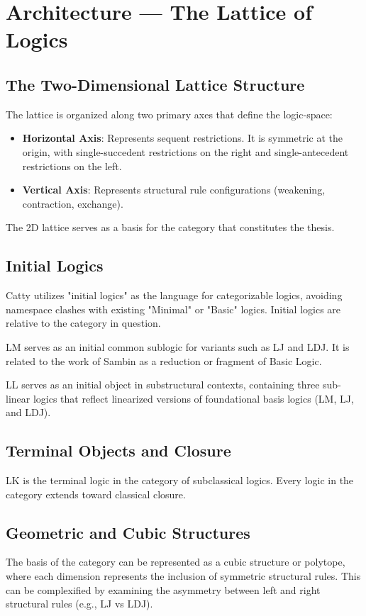 
\chapter*{Architecture --- The Lattice of Logics}

\section*{The Two-Dimensional Lattice Structure}
The lattice is organized along two primary axes that define the logic-space:
\begin{itemize}
    \item \textbf{Horizontal Axis}: Represents sequent restrictions. It is symmetric at the origin, with single-succedent restrictions on the right and single-antecedent restrictions on the left.
    \item \textbf{Vertical Axis}: Represents structural rule configurations (weakening, contraction, exchange).
\end{itemize}
The 2D lattice serves as a basis for the category that constitutes the thesis.

\section*{Initial Logics}
Catty utilizes "initial logics" as the language for categorizable logics, avoiding namespace clashes with existing "Minimal" or "Basic" logics. Initial logics are relative to the category in question. 

LM serves as an initial common sublogic for variants such as LJ and LDJ. It is related to the work of Sambin \cite{sambin2000basic} as a reduction or fragment of Basic Logic. 

LL serves as an initial object in substructural contexts, containing three sub-linear logics that reflect linearized versions of foundational basis logics (LM, LJ, and LDJ).

\section*{Terminal Objects and Closure}
LK is the terminal logic in the category of subclassical logics. Every logic in the category extends toward classical closure.

\section*{Geometric and Cubic Structures}
The basis of the category can be represented as a cubic structure or polytope, where each dimension represents the inclusion of symmetric structural rules. This can be complexified by examining the asymmetry between left and right structural rules (e.g., LJ vs LDJ).
